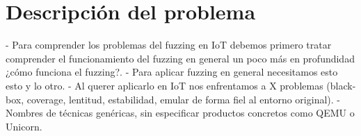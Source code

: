 \chapter{Descripción del problema}
\label{descripcion}
- Para comprender los problemas del fuzzing en IoT debemos primero tratar comprender el funcionamiento 
del fuzzing en general un poco más en profundidad ¿cómo funciona el fuzzing?.
- Para aplicar fuzzing en general necesitamos esto esto y lo otro.
- Al querer aplicarlo en IoT nos enfrentamos a X problemas (black-box, coverage, lentitud, estabilidad, 
emular de forma fiel al entorno original).
- Nombres de técnicas genéricas, sin especificar productos concretos como QEMU o Unicorn.